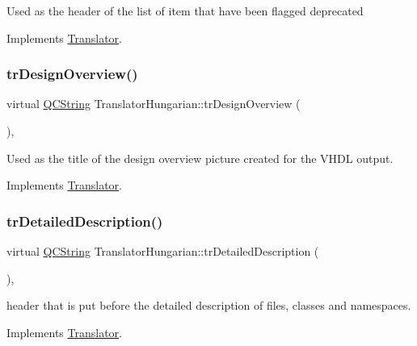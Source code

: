 Used as the header of the list of item that have been flagged deprecated 

Implements \mbox{\hyperlink{class_translator}{Translator}}.

\mbox{\label{class_translator_hungarian_a164b311177a8a5b7d718c8cb0a7cd8c8}} 
\subsubsection{\texorpdfstring{trDesignOverview()}{trDesignOverview()}}
{\footnotesize\ttfamily virtual \mbox{\hyperlink{class_q_c_string}{Q\+C\+String}} Translator\+Hungarian\+::tr\+Design\+Overview (\begin{DoxyParamCaption}{ }\end{DoxyParamCaption})\hspace{0.3cm}{\ttfamily [inline]}, {\ttfamily [virtual]}}

Used as the title of the design overview picture created for the V\+H\+DL output. 

Implements \mbox{\hyperlink{class_translator}{Translator}}.

\mbox{\label{class_translator_hungarian_abdedb99002ba9042debdc5f625c963ed}} 
\subsubsection{\texorpdfstring{trDetailedDescription()}{trDetailedDescription()}}
{\footnotesize\ttfamily virtual \mbox{\hyperlink{class_q_c_string}{Q\+C\+String}} Translator\+Hungarian\+::tr\+Detailed\+Description (\begin{DoxyParamCaption}{ }\end{DoxyParamCaption})\hspace{0.3cm}{\ttfamily [inline]}, {\ttfamily [virtual]}}

header that is put before the detailed description of files, classes and namespaces. 

Implements \mbox{\hyperlink{class_translator}{Translator}}.

